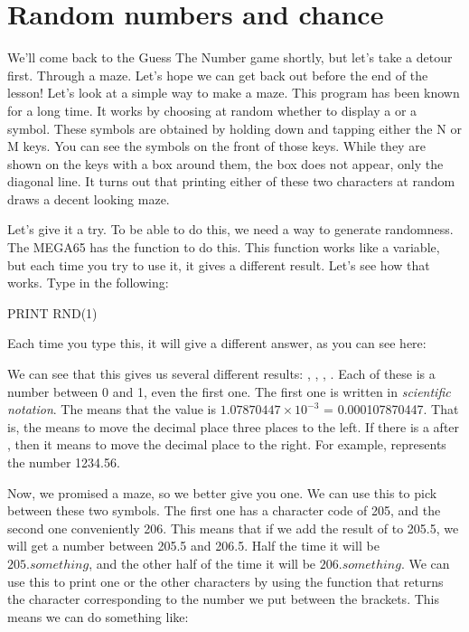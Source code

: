 \section{Random numbers and chance}

We'll come back to the Guess The Number game shortly, but let's take a
detour first. Through a maze. Let's hope we can get back out before
the end of the lesson!  Let's look at a simple way to make a
maze. This program has been known for a long time.  It works by
choosing at random whether to display a {} or a
{} symbol.  These symbols are obtained by holding down
 and tapping either the N or M keys.  You
can see the symbols on the front of those keys.  While they are shown
on the keys with a box around them, the box does not appear, only the
diagonal line.  It turns out that printing either of these two
characters at random draws a decent looking maze.

\needspace{4cm}
Let's give it a try.  To be able to do this, we need a way to generate
randomness.  The MEGA65 has the  function to do this.  This
function works like a variable, but each time you try to use it, it
gives a different result.  Let's see how that works.  Type in the
following:

\begin{screencode}
PRINT RND(1)
\end{screencode}

Each time you type this, it will give a different answer, as you can
see here:


We can see that this gives us several different results: ,
, , .  Each of these is
a number between 0 and 1, even the first one.  The first one is
written in {\em scientific notation}.  The
 means that the value is $1.07870447\times10^{-3}$ =
0.000107870447.  That is, the  means to move the decimal
place three places to the left. If there is a \stw{+} after ,
then it means to move the decimal place to the right. For example,
 represents the number 1234.56.

\needspace{3cm}
Now, we promised a maze, so we better give you one. We can use this
 to pick between these two symbols.  The first one has a
character code of 205, and the second one conveniently 206.  This
means that if we add the result of  to 205.5, we will get
a number between 205.5 and 206.5.  Half the time it will be
$205.something$, and the other half of the time it will be $206.something$.
We can use this to print one or the other characters by using the
 function that returns the character corresponding to the
number we put between the brackets.  This means we can do something
like:

